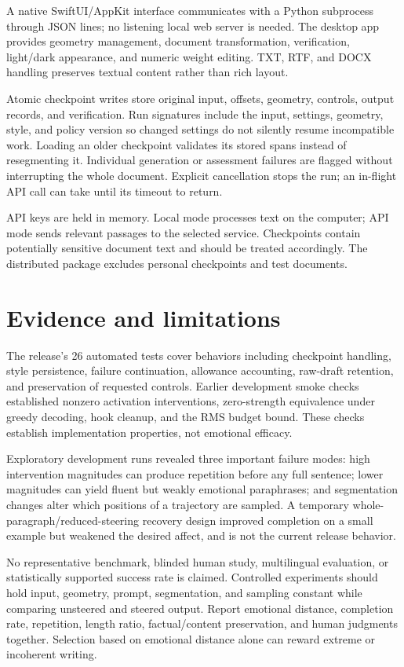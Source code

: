 \documentclass[manuscript,screen,nonacm]{acmart}
\begin{document}
A native SwiftUI/AppKit interface communicates with a Python subprocess
through JSON lines; no listening local web server is needed. The desktop
app provides geometry management, document transformation, verification,
light/dark appearance, and numeric weight editing. TXT, RTF, and DOCX
handling preserves textual content rather than rich layout.

Atomic checkpoint writes store original input, offsets, geometry,
controls, output records, and verification. Run signatures include the
input, settings, geometry, style, and policy version so changed settings
do not silently resume incompatible work. Loading an older checkpoint
validates its stored spans instead of resegmenting it. Individual
generation or assessment failures are flagged without interrupting the
whole document. Explicit cancellation stops the run; an in-flight API
call can take until its timeout to return.

API keys are held in memory. Local mode processes text on the computer;
API mode sends relevant passages to the selected service. Checkpoints
contain potentially sensitive document text and should be treated
accordingly. The distributed package excludes personal checkpoints and
test documents.

\section{Evidence and limitations}\label{evidence-and-limitations}

The release's 26 automated tests cover behaviors including checkpoint
handling, style persistence, failure continuation, allowance accounting,
raw-draft retention, and preservation of requested controls. Earlier
development smoke checks established nonzero activation interventions,
zero-strength equivalence under greedy decoding, hook cleanup, and the
RMS budget bound. These checks establish implementation properties, not
emotional efficacy.

Exploratory development runs revealed three important failure modes:
high intervention magnitudes can produce repetition before any full
sentence; lower magnitudes can yield fluent but weakly emotional
paraphrases; and segmentation changes alter which positions of a
trajectory are sampled. A temporary whole-paragraph/reduced-steering
recovery design improved completion on a small example but weakened the
desired affect, and is not the current release behavior.

No representative benchmark, blinded human study, multilingual
evaluation, or statistically supported success rate is claimed.
Controlled experiments should hold input, geometry, prompt,
segmentation, and sampling constant while comparing unsteered and
steered output. Report emotional distance, completion rate, repetition,
length ratio, factual/content preservation, and human judgments
together. Selection based on emotional distance alone can reward extreme
or incoherent writing.
\end{document}
